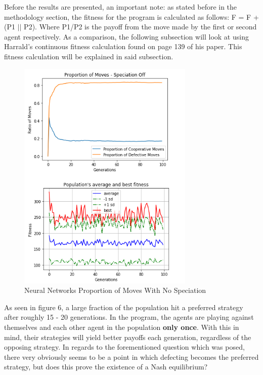 \documentclass[12pt,a4paper]{article}
\begin{document}
Before the results are presented, an important note: as stated before in the methodology section, the fitness for the program is calculated as follows: F = F + (P1 $||$  P2). Where P1/P2 is the payoff from the move made by the first or second agent respectively. As a comparison, the following subsection will look at using Harrald's continuous fitness calculation\cite{25} found on page 139 of his paper. This fitness calculation will be explained in said subsection.

\begin{figure}[H]
	\centering
		\includegraphics[width=0.75\textwidth]{RatioSpeciationOff}
		\caption{Neural Networks Proportion of Moves With No Speciation}
\end{figure}

As seen in figure 6, a large fraction of the population hit a preferred strategy after roughly 15 - 20 generations. In the program, the agents are playing against themselves and each other agent in the population \textbf{only once}. With this in mind, their strategies will yield better payoffs each generation, regardless of the opposing strategy. In regards to the forementioned question which was posed, there very obviously seems to be a point in which defecting becomes the preferred strategy, but does this prove the existence of a Nash equilibrium?
\end{document}
